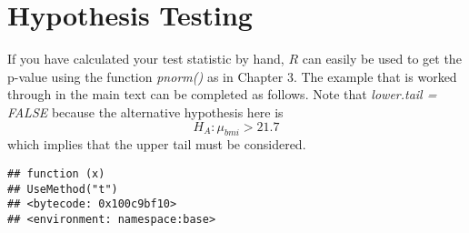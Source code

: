\begin{knitrout}
\begin{kframe}
{\ttfamily\noindent\bfseries\color{errorcolor}{\#\# Error in eval(expr, envir, enclos): object 's' not found}}\begin{alltt}
 \hlkwb{=} 
 \hlkwb{=} \hlstd{(}  \hlopt{+} \hlstd{(}\hlopt{-}\hlopt{/}\hlstd{,}  \hlstd{=} \hlstd{)}
 \hlkwb{=}  \hlopt{-} \hlopt{*} \hlopt{+} \hlopt{*}
\end{alltt}


{\ttfamily\noindent\bfseries\color{errorcolor}{\#\# Error in eval(expr, envir, enclos): object 'xbar' not found}}\begin{alltt}
\end{alltt}


{\ttfamily\noindent\bfseries\color{errorcolor}{\#\# Error in eval(expr, envir, enclos): object 'ci' not found}}\end{kframe}
\end{knitrout}

\section{Hypothesis Testing}
If you have calculated your test statistic by hand, $R$ can easily be used to get the p-value using the function \textit{pnorm()} as in Chapter 3.  The example that is worked through in the main text can be completed as follows.  Note that \textit{lower.tail = FALSE} because the alternative hypothesis here is 
\[ H_A: \mu_{bmi} > 21.7 \]
which implies that the upper tail must be considered.  
\begin{knitrout}
\color{fgcolor}\begin{kframe}
\begin{alltt}
 \hlkwb{=} 
 \hlkwb{=}  \hlopt{-} \hlopt{/}\hlopt{/}
\end{alltt}


{\ttfamily\noindent\bfseries\color{errorcolor}{\#\# Error in eval(expr, envir, enclos): object 'xbar' not found}}\begin{alltt}
\end{alltt}
\begin{verbatim}
## function (x) 
## UseMethod("t")
## <bytecode: 0x100c9bf10>
## <environment: namespace:base>
\end{verbatim}
\begin{alltt}
  \hlstd{=} \hlstd{)}
\end{alltt}


{\ttfamily\noindent\bfseries\color{errorcolor}{\#\# Error in pnorm(t, lower.tail = FALSE): Non-numeric argument to mathematical function}}\end{kframe}
\end{knitrout}

